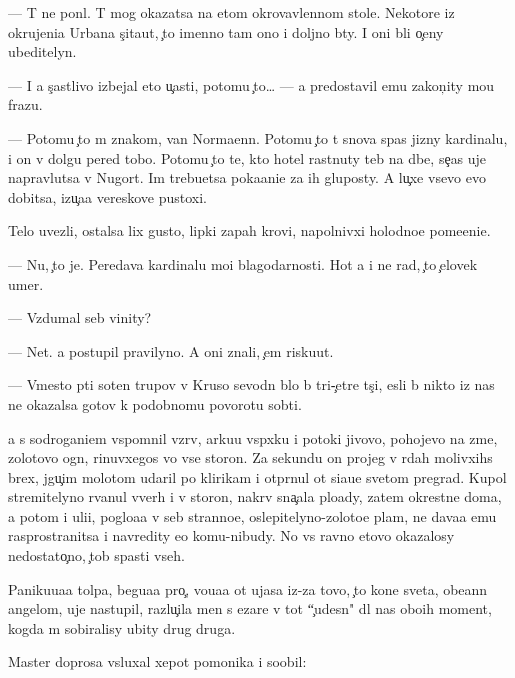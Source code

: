 \documentclass[10pt]{book}
\begin{document}
— T{\yi} ne pon{\ia}l. T{\yi} mog okazatsa na etom okrovavlennom stole. Nekotor{\yi}{\y}e iz okrujeni{\y}a Urbana s{\c}ita{\y}ut, {\c}to imenno tam ono i doljno b{\yi}ty. I oni b{\yi}li o{\c}eny ubeditelyn{\yi}.

— I {\y}a s{\c}astlivo izbejal eto{\y} u{\c}asti, potomu {\c}to… — {\Y}a predostavil {\y}emu zakon{\c}ity mo{\y}u frazu.

— Potomu {\c}to m{\yi} znakom{\yi}, van Normaenn. Potomu {\c}to t{\yi} snova spas jizny kardinalu, i on v dolgu pered tobo{\y}. Potomu {\c}to te, kto hotel rast{\ia}nuty teb{\ia} na d{\yi}be, se{\y}{\c}as uje napravl{\ia}{\y}utsa v N{\y}ugort. Im trebu{\y}etsa poka{\y}ani{\y}e za ih gluposty. A lu{\c}xe vsevo {\y}evo dobitsa, izu{\c}a{\y}a vereskov{\yi}{\y}e pustoxi.

Telo uvezli, ostalsa lix gusto{\y}, lipki{\y} zapah krovi, napolnivxi{\y} holodno{\y}e pome{\x}eni{\y}e.

— Nu, {\c}to je. Peredava{\y} kardinalu mo{\y}i blagodarnosti. Hot{\ia} {\y}a i ne rad, {\c}to {\c}elovek umer.

— Vzdumal seb{\ia} vinity?

— Net. {\Y}a postupil pravilyno. A oni znali, {\c}em risku{\y}ut.

— Vmesto p{\ia}ti soten trupov v Kruso sevodn{\ia} b{\yi}lo b{\yi} tri-{\c}et{\yi}re t{\yi}s{\ia}{\c}i, {\y}esli b{\yi} nikto iz nas ne okazalsa gotov k podobnomu povorotu sob{\yi}ti{\y}.

{\Y}a s sodrogani{\y}em vspomnil vzr{\yi}v, {\y}arku{\y}u vsp{\yi}xku i potoki jivovo, pohojevo na zme{\y}, zolotovo ogn{\ia}, rinuvxegos{\ia} vo vse storon{\yi}. Za sekundu on projeg v r{\ia}dah molivxihs{\ia} brex, jgu{\c}im molotom udaril po klirikam i otpr{\ia}nul ot si{\y}a{\y}u{\x}e{\y} svetom pregrad{\yi}. Kupol stremitelyno rvanul vverh i v storon{\yi}, nakr{\yi}v sna{\c}ala plo{\x}ady, zatem okrestn{\yi}{\y}e doma, a potom i uli{\q}i, poglo{\x}a{\y}a v seb{\ia} stranno{\y}e, oslepitelyno-zoloto{\y}e plam{\ia}, ne dava{\y}a {\y}emu rasprostranitsa i navredity {\y}e{\x}o komu-nibudy. No vs{\e} ravno etovo okazalosy nedostato{\c}no, {\c}tob{\yi} spasti vseh.

Paniku{\y}u{\x}a{\y}a tolpa, begu{\x}a{\y}a pro{\c}, vo{\y}u{\x}a{\y}a ot ujasa iz-za tovo, {\c}to kone{\q} sveta, obe{\x}ann{\yi}{\y} angelom, uje nastupil, razlu{\c}ila men{\ia} s {\C}ezare v tot ``{\c}udesn{\yi}{\y}" dl{\ia} nas obo{\y}ih moment, kogda m{\yi} sobiralisy ubity drug druga.

Master doprosa v{\yi}sluxal xepot pomo{\x}nika i soob{\x}il:
\end{document}
